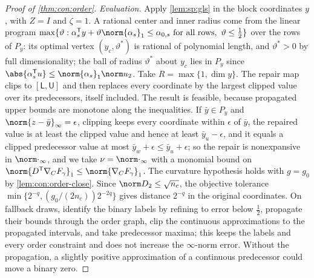 \begin{proof}[Proof of \cref{thm:con:order}]
\emph{Evaluation.} Apply \cref{lem:sp:gls} in the block coordinates $y$, with
$Z=I$ and $\zeta=1$. A rational center and inner radius come from the linear
program $\max\{\vartheta:\alpha_s^{\mathsf T}y+\vartheta\norm{\alpha_s}_1\le
\alpha_{0,s}\text{ for all rows},\ \vartheta\le\frac12\}$ over the rows of $P_y$:
its optimal vertex $(y_c,\vartheta^*)$ is rational of polynomial length, and
$\vartheta^*>0$ by full dimensionality; the ball of radius $\vartheta^*$ about
$y_c$ lies in $P_y$ since $\abs{\alpha_s^{\mathsf T}u}\le\norm{\alpha_s}_1\norm
u_2$. Take $R=\max\{1,\dim y\}$. The repair map clips to $[\mathsf L,\mathsf U]$
and then replaces every coordinate by the largest clipped value over its
predecessors, itself included. The result is feasible, because propagated
upper bounds are monotone along the inequalities. If $\bar y\in P_y$ and
$\norm{z-\bar y}_\infty=\epsilon$, clipping keeps every coordinate within
$\epsilon$ of $\bar y$, the repaired value is at least the clipped value and
hence at least $\bar y_u-\epsilon$, and it equals a clipped predecessor value
at most $\bar y_w+\epsilon\le\bar y_u+\epsilon$; so the repair is
nonexpansive in $\norm\cdot_\infty$, and we take $\nu=\norm\cdot_\infty$ with a
monomial bound on $\norm{D^{\mathsf T}\nabla_CF_\gamma}_1\le\norm{\nabla_CF_\gamma}_1$.
The curvature hypothesis holds with $g=g_0$ by \cref{lem:con:order-close}.
Since $\norm D_2\le\sqrt{n_c}$, the objective tolerance
$\min\{2^{-q},(g_0/(2n_c))2^{-2q}\}$ gives distance $2^{-q}$ in the original
coordinates. On fallback draws, identify the binary labels by refining to
error below $\frac12$, propagate their bounds through the order graph, clip the
continuous approximations to the propagated intervals, and take predecessor
maxima; this keeps the labels and every order constraint and does not
increase the $\infty$-norm error. Without the propagation, a slightly positive
approximation of a continuous predecessor could move a binary zero.
\end{proof}
